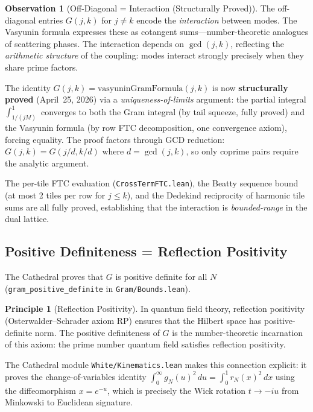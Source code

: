 \documentclass[11pt,a4paper]{article}
\theoremstyle{definition}
\newtheorem{principle}[definition]{Principle}
\newtheorem{observation}[definition]{Observation}
\newcommand{\lean}[1]{\texttt{#1}}
\begin{document}
\begin{observation}[Off-Diagonal = Interaction (Structurally Proved)]
The off-diagonal entries $G(j,k)$ for $j \neq k$ encode the
\emph{interaction} between modes. The Vasyunin formula expresses these
as cotangent sums---number-theoretic analogues of scattering phases.
The interaction depends on $\gcd(j,k)$, reflecting the
\emph{arithmetic structure} of the coupling: modes interact strongly
precisely when they share prime factors.

The identity $G(j,k) = \text{vasyuninGramFormula}(j,k)$ is now
\textbf{structurally proved} (April~25, 2026) via a
\emph{uniqueness-of-limits} argument: the partial integral
$\int_{1/(jM)}^1$ converges to both the Gram integral (by tail
squeeze, fully proved) and the Vasyunin formula (by row FTC
decomposition, one convergence axiom), forcing equality. The proof
factors through GCD reduction: $G(j,k) = G(j/d, k/d)$ where
$d = \gcd(j,k)$, so only coprime pairs require the analytic argument.

The per-tile FTC evaluation (\lean{CrossTermFTC.lean}),
the Beatty sequence bound (at most 2 tiles per row for $j \leq k$),
and the Dedekind reciprocity of harmonic tile sums are all
fully proved, establishing that the interaction is
\emph{bounded-range} in the dual lattice.
\end{observation}

\subsection{Positive Definiteness = Reflection Positivity}

The Cathedral proves that $G$ is positive definite for all $N$
(\lean{gram\_positive\_definite} in \lean{Gram/Bounds.lean}).

\begin{principle}[Reflection Positivity]
In quantum field theory, reflection positivity (Osterwalder--Schrader
axiom RP) ensures that the Hilbert space has positive-definite norm.
The positive definiteness of $G$ is the number-theoretic incarnation
of this axiom: the prime number quantum field satisfies reflection
positivity.

The Cathedral module \lean{White/Kinematics.lean} makes this connection
explicit: it proves the change-of-variables identity
$\int_0^\infty g_N(u)^2\,du = \int_0^1 r_N(x)^2\,dx$
using the diffeomorphism $x = e^{-u}$, which is precisely the
Wick rotation $t \to -iu$ from Minkowski to Euclidean signature.
\end{principle}
\end{document}
